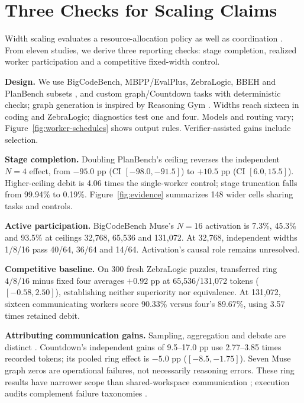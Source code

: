 \documentclass[11pt,a4paper]{article}
\begin{document}
\section{Three Checks for Scaling Claims}
Width scaling evaluates a resource-allocation policy as well as coordination
\citep{snell2024compute,kim2025agents}.
From eleven studies, we derive three reporting checks: stage completion,
realized worker participation and a competitive fixed-width control.

\textbf{Design.}
We use BigCodeBench, MBPP/EvalPlus, ZebraLogic, BBEH and PlanBench subsets
\citep{zhuo2024bigcodebench,austin2021mbpp,liu2023evalplus,lin2025zebralogic,kazemi2025bbeh,valmeekam2023planbench},
and custom graph/Countdown tasks with deterministic checks; graph generation
is inspired by Reasoning Gym \citep{stojanovski2025gym}.
Widths reach sixteen in coding and ZebraLogic; diagnostics test one and four.
Models and routing vary; Figure~\ref{fig:worker-schedules} shows output rules.
Verifier-assisted gains include selection.

\textbf{Stage completion.}
Doubling PlanBench's ceiling reverses the independent $N=4$ effect,
from $-95.0$ pp (CI $[-98.0,-91.5]$) to $+10.5$ pp (CI $[6.0,15.5]$).
Higher-ceiling debit is 4.06 times the single-worker control; stage truncation
falls from 99.94\% to 0.19\%. Figure~\ref{fig:evidence} summarizes 148 wider
cells sharing tasks and controls.

\textbf{Active participation.}
BigCodeBench Muse's $N=16$ activation is 7.3\%, 45.3\% and 93.5\% at ceilings
32,768, 65,536 and 131,072. At 32,768, independent widths 1/8/16 pass
40/64, 36/64 and 14/64. Activation's causal role remains unresolved.

\textbf{Competitive baseline.}
On 300 fresh ZebraLogic puzzles, transferred ring $4/8/16$ minus fixed four
averages $+0.92$ pp at 65,536/131,072 tokens ($[-0.58,2.50]$), establishing
neither superiority nor equivalence. At 131,072, sixteen communicating workers score
90.33\% versus four's 89.67\%, using 3.57 times retained debit.

\textbf{Attributing communication gains.}
Sampling, aggregation and debate are distinct
\citep{brown2024monkeys,wang2023selfconsistency,du2024debate}.
Countdown's independent gains of 9.5--17.0 pp use 2.77--3.85 times recorded tokens;
its pooled ring effect is $-5.0$ pp ($[-8.5,-1.75]$). Seven Muse graph zeros are
operational failures, not necessarily reasoning errors. These ring results
have narrower scope than shared-workspace communication
\citep{park2026discovery}; execution audits complement failure taxonomies
\citep{cemri2025failures}.
\end{document}
